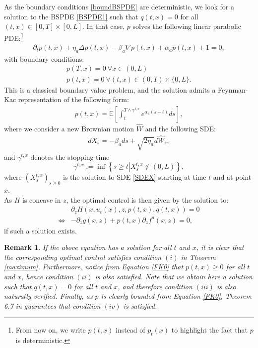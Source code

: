 \documentclass[11pt]{article}
\newtheorem{rem}{Remark}
\begin{document}
As the boundary conditions \eqref{boundBSPDE} are deterministic, we look for a solution to the BSPDE \eqref{BSPDE1} such that $q(t,x) = 0$ for all $(t,x) \in [0,T] \times [0,L]$. In that case, $p$ solves the following linear parabolic PDE:\footnote{From now on, we write $p(t,x)$ instead of $p_t(x)$ to highlight the fact that $p$ is deterministic.}
\begin{align}\label{PDE0}
    \partial_t p(t,x) + \eta_a \Delta p(t,x) - \beta_a \nabla p(t,x)  + \alpha_a p(t,x) + 1 = 0,
\end{align}
with boundary conditions:
\begin{align}\label{boundPDE0}
    p(T,x) = 0 \ \forall x \in (0,L)\\
    p(t,x) = 0 \ \forall (t,x) \in (0,T) \times \{0,L\}. \nonumber 
\end{align}
This is a classical boundary value problem, and the solution admits a Feynman-Kac representation of the following form:
\begin{align} \label{FK0}
p(t,x) = \mathbb E \left[ \int_t^{T\wedge \gamma^{t,x}} e^{\alpha_a (s-t)}ds\right],    
\end{align}
where we consider a new Brownian motion $\widehat W$ and the following SDE:
\begin{align}\label{SDEX}
dX_s = -\beta_a ds + \sqrt{2 \eta_a}d\widehat W_s,  
\end{align}
and $\gamma^{t,x}$ denotes the stopping time
$$\gamma^{t,x} := \inf \left\{ s\ge t \left| X^{t,x}_s \not\in (0,L) \right.\right\},$$
where $(X^{t,x}_s)_{s\ge 0}$ is the solution to SDE \eqref{SDEX} starting at time $t$ and at point $x$.\\

As $H$ is concave in $z$, the optimal control is then given by the solution to:
\begin{align*}
    & \partial_z H\left(x,u_t(x), z, p(t,x), q(t,x) \right)= 0\\
     \iff & - \partial_z g(x,z) + p(t,x) \partial_z f^a(x,z)=0,
\end{align*}
if such a solution exists.

\begin{rem}
If the above equation has a solution for all $t$ and $x$, it is clear that the corresponding optimal control satisfies condition $(i)$ in Theorem \ref{maximum}. Furthermore, notice from Equation \eqref{FK0} that $p(t,x) \ge 0$ for all $t$ and $x$, hence condition $(ii)$ is also satisfied. Note that we obtain here a solution such that $q(t,x) = 0$ for all $t$ and $x$, and therefore condition $(iii)$ is also naturally verified. Finally, as $p$ is clearly bounded from Equation \eqref{FK0}, Theorem 6.7 in \cite{da2014stochastic} guarantees that condition $(iv)$ is satisfied.
\end{rem}
\end{document}
